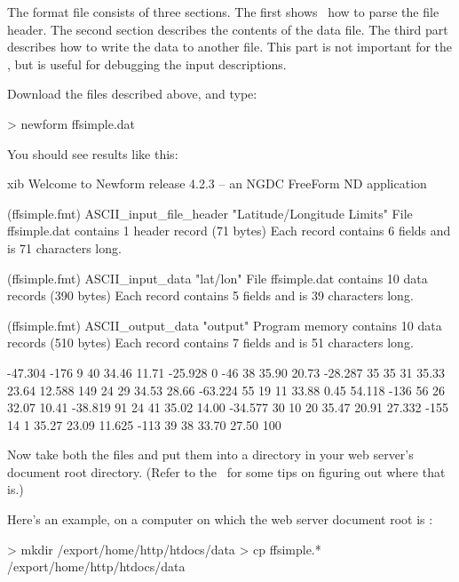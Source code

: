 The format file consists of three sections.  The first shows \ffnd\
how to parse the file header.  The second section describes the
contents of the data file.  The third part describes how to write the
data to another file.  This part is not important for the \ffs , but
is useful for debugging the input descriptions.

Download the  files described above, and type:

\begin{example}
> newform ffsimple.dat
\end{example}

You should see results like this:

\begin{vcode}{xib}
Welcome to Newform release 4.2.3 -- an NGDC FreeForm ND application

(ffsimple.fmt) ASCII_input_file_header  "Latitude/Longitude Limits"
File ffsimple.dat contains 1 header record (71 bytes)
Each record contains 6 fields and is 71 characters long.

(ffsimple.fmt) ASCII_input_data "lat/lon"
File ffsimple.dat contains 10 data records (390 bytes)
Each record contains 5 fields and is 39 characters long.

(ffsimple.fmt) ASCII_output_data        "output"
Program memory contains 10 data records (510 bytes)
Each record contains 7 fields and is 51 characters long.

   -47.304 -176   9  40            34.46     11.71
   -25.928    0 -46  38            35.90     20.73
   -28.287   35  35  31            35.33     23.64
    12.588  149  24  29            34.53     28.66
   -63.224   55  19  11            33.88      0.45
    54.118 -136  56  26            32.07     10.41
   -38.819   91  24  41            35.02     14.00
   -34.577   30  10  20            35.47     20.91
    27.332 -155  14   1            35.27     23.09
    11.625 -113  39  38            33.70     27.50
100%
\end{vcode}

Now take both the  files and put them into a directory
in your web server's document root directory.  (Refer to the
\DODSuser\ for some tips on figuring out where that is.)

Here's an example, on a computer on which the web server document root
is \lit{/export/home/http/htdocs}:

\begin{example}
> mkdir /export/home/http/htdocs/data
> cp ffsimple.* /export/home/http/htdocs/data
\end{example}

